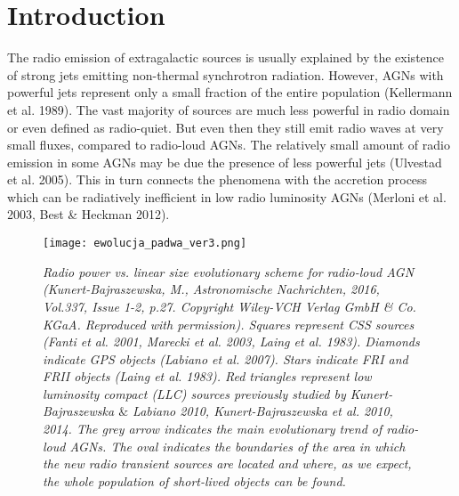 \documentclass[utf8]{frontiersSCNS} %
\begin{document}
\section{Introduction}

The radio emission of extragalactic sources is usually explained by the existence of strong jets emitting non-thermal synchrotron radiation. However, AGNs with powerful jets represent only a small fraction of the entire population (Kellermann et al. 1989). The vast majority of sources are much less powerful in radio domain or even defined as radio-quiet. But even then they still emit radio waves at very small fluxes, compared to radio-loud AGNs. The relatively small amount of radio emission in some AGNs may be due the presence of less powerful jets (Ulvestad et al. 2005). This in turn connects the phenomena with the accretion process which can be radiatively inefficient in low radio luminosity AGNs (Merloni et al. 2003, Best \& Heckman 2012). 


\begin{figure}[t]
\center
\texttt{[image: ewolucja\_padwa\_ver3.png]}
\caption{\small \it  Radio power vs. linear size evolutionary scheme for radio-loud AGN (Kunert-Bajraszewska, M., Astronomische Nachrichten, 2016, Vol.337, Issue 1-2, p.27. Copyright Wiley-VCH Verlag GmbH \& Co. KGaA. Reproduced with permission). Squares represent CSS sources (Fanti et al. 2001, Marecki et al. 2003, Laing et al. 1983). Diamonds indicate GPS objects (Labiano et al. 2007). Stars indicate FRI and FRII objects (Laing et al. 1983).
Red triangles represent low luminosity compact (LLC) sources previously studied by Kunert-Bajraszewska $\&$ Labiano 2010, Kunert-Bajraszewska et al. 2010, 2014. The grey arrow indicates the main evolutionary trend of radio-loud AGNs. The oval indicates the boundaries of the area in which the new radio transient sources are located and where, as we expect, the whole population of short-lived objects can be found.
}
\end{figure}
\end{document}
